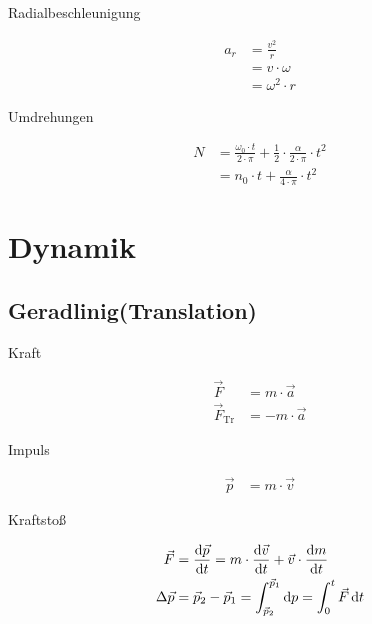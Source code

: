 \begin{boxleft}Radialbeschleunigung
\end{boxleft}\begin{boxrightshaded}
\begin{align}
a_r&=\frac{v^2}{r}\\
&=v\cdot\omega\\
&=\omega^2\cdot r
\end{align}
\end{boxrightshaded}

\begin{boxleft}Umdrehungen
\end{boxleft}\begin{boxrightshaded}
\begin{align}
N	&=\frac{\omega_0\cdot t}{2\cdot \pi}+\frac{1}{2}\cdot\frac{\alpha}{2\cdot \pi}\cdot t^2\\
	&=n_0\cdot t+\frac{\alpha}{4\cdot\pi}\cdot t^2
\end{align}
\end{boxrightshaded}

\section{Dynamik}
\subsection{Geradlinig(Translation)}
\begin{boxleft}Kraft
\end{boxleft}\begin{boxrightshaded}
\begin{align}
\vec{F}&=m\cdot \vec{a}\\
\vec{F}_{\text{Tr}}&=-m\cdot \vec{a}
\end{align}
\end{boxrightshaded}

\begin{boxleft}Impuls
\end{boxleft}\begin{boxrightshaded}
\begin{align}
\vec{p}&=m\cdot \vec{v}
\end{align}
\end{boxrightshaded}

\begin{boxleft}Kraftstoß
\end{boxleft}\begin{boxrightshaded}
\begin{align}
\vec{F}&=\frac{\diff \vec{p}}{\diff t}=m\cdot\frac{\diff \vec{v}}{\diff t}+\vec{v}\cdot\frac{\diff m}{\diff t}\\
\Delta\vec{p}&=\vec{p}_2-\vec{p}_1=\int_{\vec{p}_2}^{\vec{p}_1}\diff p=\int_0^{t}\vec{F}\diff t
\end{align}
\end{boxrightshaded}


